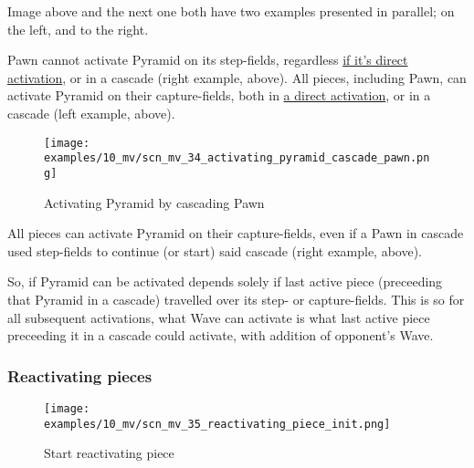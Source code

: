 \vspace*{-0.3\baselineskip}
Image above and the next one both have two examples presented in parallel; on the left,
and to the right.

Pawn cannot activate Pyramid on its step-fields, regardless
\hyperref[fig:scn_ma_04_pyramid_activation_by_pawn]{if it's direct activation}, or in a cascade
(right example, above). All pieces, including Pawn, can activate Pyramid on their capture-fields,
both in \hyperref[fig:scn_ma_01_pyramid_activation_init]{a direct activation}, or in a cascade
(left example, above).

\clearpage %

\vspace*{-2.5\baselineskip}
\noindent
\begin{figure}[!h]
\texttt{[image: examples/10\_mv/scn\_mv\_34\_activating\_pyramid\_cascade\_pawn.png]}
\vspace*{-1.5\baselineskip}
\caption{Activating Pyramid by cascading Pawn}
\label{fig:scn_mv_34_activating_pyramid_cascade_pawn}
\end{figure}

\vspace*{-0.5\baselineskip}
All pieces can activate Pyramid on their capture-fields, even if a Pawn in cascade
used step-fields to continue (or start) said cascade (right example, above).

So, if Pyramid can be activated depends solely if last active piece (preceeding that
Pyramid in a cascade) travelled over its step- or capture-fields. This is so for all
subsequent activations, what Wave can activate is what last active piece preceeding
it in a cascade could activate, with addition of opponent's Wave.

\clearpage %

\subsubsection*{Reactivating pieces}
\label{sec:Miranda's veil/Wave/Cascading Waves/Reactivating pieces}

\vspace*{-1.4\baselineskip}
\noindent
\begin{figure}[!h]
\texttt{[image: examples/10\_mv/scn\_mv\_35\_reactivating\_piece\_init.png]}
\caption{Start reactivating piece}
\label{fig:scn_mv_35_reactivating_piece_init}
\end{figure}

